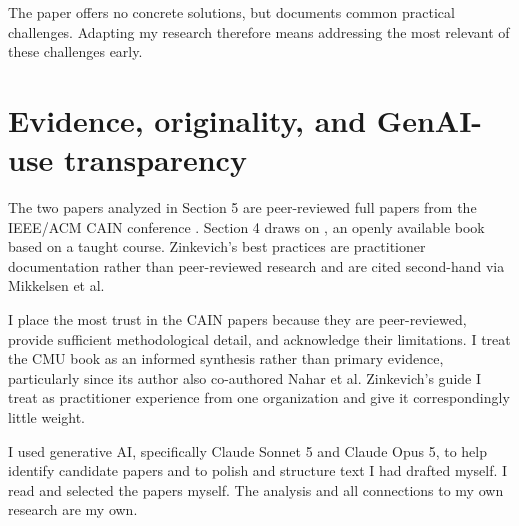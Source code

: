 \documentclass{article}
\begin{document}
The paper offers no concrete solutions, but documents common practical challenges. Adapting my research therefore means addressing the most relevant of these challenges early.

\section{Evidence, originality, and GenAI-use transparency}
The two papers analyzed in Section 5 are peer-reviewed full papers from the IEEE/ACM CAIN conference \cite{mikkelsen2025xai, nahar2023metasummary}. Section 4 draws on \citet{kastner2024mlip}, an openly available book based on a taught course. Zinkevich's best practices \cite{zinkevich2017rules} are practitioner documentation rather than peer-reviewed research and are cited second-hand via Mikkelsen et al.

I place the most trust in the CAIN papers because they are peer-reviewed, provide sufficient methodological detail, and acknowledge their limitations. I treat the CMU book as an informed synthesis rather than primary evidence, particularly since its author also co-authored Nahar et al. Zinkevich's guide I treat as practitioner experience from one organization and give it correspondingly little weight.

I used generative AI, specifically Claude Sonnet 5 and Claude Opus 5, to help identify candidate papers and to polish and structure text I had drafted myself. I read and selected the papers myself. The analysis and all connections to my own research are my own.



\end{document}
